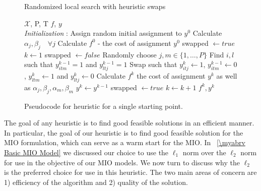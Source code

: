 \begin{figure}[ht] 
 \removelatexerror
\begin{algorithm}[H]
 \caption{Randomized local search with heuristic swaps}
 \label{alg:Basic_Heuristic}
 \begin{algorithmic}[1]
  \renewcommand{\algorithmicrequire}{\textbf{Input:}}
  \renewcommand{\algorithmicensure}{\textbf{Output:}}
 \REQUIRE $\boldsymbol{\mathcal{X}}$, P, T
 \ENSURE  $f$, $y$
 \\ \textit{Initialization} : Assign random initial assignment to $y^{0}$
  \STATE Calculate $\alpha_{j}, \beta_{j} \quad \forall j $
  \STATE Calculate $f^{0}$ - the cost of assignment $y^{0}$
  \STATE swapped $\leftarrow true$
  \STATE $k\leftarrow1$
  \STATE swapped $\leftarrow false$
  \STATE Randomly choose $j,m\in\{1,\ldots,P\}$
  \STATE Find $i,l$ such that $y^{k-1}_{itm}=1$ and $y^{k-1}_{ltj}=1$
  \STATE Swap such that $y^{k}_{itj}\leftarrow1$, $y^{k-1}_{itm}\leftarrow 0$, $y^{k}_{ltm}\leftarrow1$ and $y^{k}_{ltj}\leftarrow0$
  \STATE Calculate $f^{k}$ the cost of assignment $y^k$ as well as $\alpha_{j}, \beta_{j}, \alpha_{m}, \beta_{m}$
  \STATE $y^{k} \leftarrow y^{k-1}$
  \ELSE 
  \STATE swapped $\leftarrow true$
  \ENDIF
  \ENDFOR
  \STATE $ k \leftarrow k + 1 $
  \ENDWHILE
 \RETURN $f^{k}, y^{k}$ 
 \end{algorithmic} 
 \end{algorithm}
  \caption{Pseudocode for heuristic for a single starting point.}
  \label{fig:Basic_Heuristic}
 \end{figure}

The goal of any heuristic is to find good feasible solutions in an efficient manner. In particular, the goal of our heuristic is to find good feasible solution for the MIO formulation, which can serve as a warm start for the MIO. In \mysection~\ref{\myabrv Basic MIO Model} we discussed our choice to use the $\ell_1$ norm over the $\ell_2$ norm for use in the objective of our MIO models. We now turn to discuss why the $\ell_2$ is the preferred choice for use in this heuristic. The two main areas of concern are 1) efficiency of the algorithm and 2) quality of the solution.

